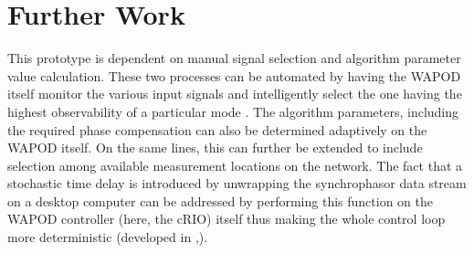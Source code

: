 \documentclass[journal]{IEEEtran}
\begin{document}

\section{Further Work}\label{Future}

This prototype is dependent on manual signal selection and algorithm parameter value calculation. These two processes can be automated by having the WAPOD itself monitor the various input signals and intelligently select the one having the highest observability of a particular mode \cite{Yuwa}. The algorithm parameters, including the required phase compensation can also be determined adaptively on the WAPOD itself. On the same lines, this can further be extended to include selection among available measurement locations on the network. The fact that a stochastic time delay is introduced by unwrapping the synchrophasor data stream on a desktop computer can be addressed by performing this function on the WAPOD controller (here, the cRIO) itself thus making the whole control loop more deterministic (developed in \cite{BabelFish},\cite{Audur}).  
\end{document}
